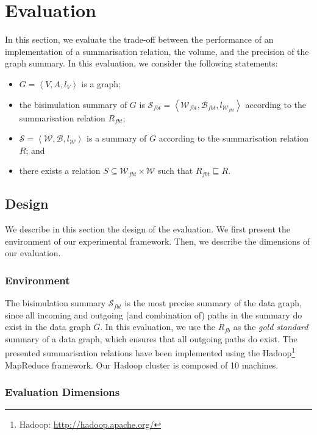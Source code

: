 \section{Evaluation}
\label{sec:eval}

In this section, we evaluate the trade-off between the performance of an implementation of a summarisation relation, the volume, and the precision of the graph summary.
In this evaluation, we consider the following statements:
\begin{itemize}
	\item $G=\left\langle V, A, l_V \right\rangle$ is a graph;
	\item the bisimulation summary of $G$ is $\mathcal{S}_{fbt} = \left\langle \mathcal{W}_{fbt}, \mathcal{B}_{fbt}, l_{\mathcal{W}_{fbt}} \right\rangle$ according to the summarisation relation $R_{fbt}$;
	\item $\mathcal{S} = \left\langle \mathcal{W}, \mathcal{B}, l_{\mathcal{W}} \right\rangle$ is a summary of $G$ according to the summarisation relation $R$; and
	\item there exists a relation $S \subseteq \mathcal{W}_{fbt} \times \mathcal{W}$ such that $R_{fbt} \sqsubseteq R$.
\end{itemize}

\subsection{Design}
\label{sec:eval:design}

We describe in this section the design of the evaluation. We first present the environment of our experimental framework. Then, we describe the dimensions of our evaluation.

\subsubsection{Environment}

The bisimulation summary $\mathcal{S}_{fbt}$ is the most precise summary of the data graph, since all incoming and outgoing (and combination of) paths in the summary do exist in the data graph $G$. In this evaluation, we use the $R_{fb}$ as the \emph{gold standard} summary of a data graph, which ensures that all outgoing paths do exist. The presented summarisation relations have been implemented using the Hadoop\footnote{Hadoop: \url{http://hadoop.apache.org/}} MapReduce framework. Our Hadoop cluster is composed of 10 machines.

\subsubsection{Evaluation Dimensions}

